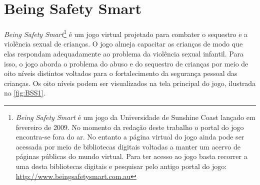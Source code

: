 


\section{Being Safety Smart}\label{sssec:Being}


\textit{Being Safety Smart}\footnote{\textit{Being Safety Smart} é um jogo  da Universidade de Sunshine Coast lançado em fevereiro de 2009. No momento da redação deste trabalho o portal do jogo encontra-se fora do ar. No entanto a página virtual do jogo ainda pode ser acessada por meio de bibliotecas digitais voltadas a manter um acervo de páginas públicas do mundo virtual. Para ter acesso ao jogo basta recorrer a uma desta bibliotecas digitais e pesquisar pelo antigo portal do jogo: \url{http://www.beingsafetysmart.com.au}} é um jogo virtual projetado para combater o sequestro e a violência sexual de crianças. O jogo almeja capacitar as crianças de modo que elas respondam adequadamente ao problema da violência sexual infantil\cite{jones2008online}. Para isso, o jogo aborda  o problema do abuso e do sequestro de crianças por meio de oito níveis distintos voltados para o fortalecimento da segurança pessoal das crianças. Os oito níveis podem ser visualizados na tela principal do jogo, ilustrada na \autoref{fig:BSS1}. 

